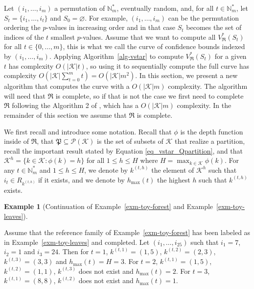 \documentclass[
  11pt,
  a4paper,
]{article}
\theoremstyle{plain}
\theoremstyle{definition}
\newtheorem{example}{Example}[section]
\theoremstyle{plain}
\theoremstyle{definition}
\theoremstyle{plain}
\theoremstyle{remark}
\begin{document}
Let \((i_1,\dotsc, i_m)\) a permutation of \(\mathbb{N}_m^*\),
eventually random, and, for all \(t\in\mathbb{N}_m^*\), let
\(S_t=\{i_1,\dotsc,i_t\}\) and \(S_0=\varnothing\). For example,
\((i_1,\dotsc, i_m)\) can be the permutation ordering the \(p\)-values
in increasing order and in that case \(S_t\) becomes the set of indices
of the \(t\) smallest \(p\)-values. Assume that we want to compute all
\(V^*_{\mathfrak{R}}(S_t)\) for all \(t\in\{ 0,\dotsc,m\}\), this is
what we call the curve of confidence bounds indexed by
\((i_1,\dotsc, i_m).\) Applying  Algorithm~\ref{alg-vstar}  to compute
\(V^*_{\mathfrak{R}}(S_t)\) for a given \(t\) has complexity
\(O(|\mathcal{K}|t)\), so using it to sequentially compute the full
curve has complexity
\(O\left(  |\mathcal{K}|\sum_{t=0}^m t\right)=O\left(|\mathcal{K}|m^2\right)\).
In this section, we present a new algorithm that computes the curve with
a \(O\left(|\mathcal{K}|m\right)\) complexity. The algorithm will need
that \(\mathfrak{R}\) is complete, so if that is not the case we first
need to complete \(\mathfrak{R}\) following the Algorithm 2 of
\citet{MR4178188}, which has a \(O(|\mathcal{K}|m)\) complexity. In the
remainder of this section we assume that \(\mathfrak{R}\) is complete.

We first recall and introduce some notation. Recall that \(\phi\) is the
depth function inside of \(\mathfrak{R}\), that
\(\mathfrak P \subseteq \mathcal P(\mathcal{K})\) is the set of subsets
of \(\mathcal{K}\) that realize a partition, recall the important result
stated by Equation \eqref{eq_vstar_Qpartition}, and that
\(\mathcal{K}^h=\{ k\in\mathcal{K}: \phi(k)=h  \}\) for all
\(1\leq h\leq H\) where \(H=\max_{k\in\mathcal{K}}\phi(k)\). For any
\(t\in\mathbb{N}_m^*\) and \(1\leq h\leq H\), we denote by \(k^{(t,h)}\)
the element of \(\mathcal{K}^h\) such that \(i_t\in R_{k^{(t,h)}}\) if
it exists, and we denote by \(h_{\max}(t)\) the highest \(h\) such that
\(k^{(t,h)}\) exists.

\begin{example}[Continuation of Example~\ref{exm-toy-forest} and
Example~\ref{exm-toy-leaves}]\protect\hypertarget{exm-kth}{}\label{exm-kth}

Assume that the reference family of Example~\ref{exm-toy-forest} has
been labeled as in Example~\ref{exm-toy-leaves} and completed. Let
\((i_1,\dotsc, i_{25})\) such that \(i_1=7\), \(i_2=1\) and \(i_3=24\).
Then for \(t=1\), \(k^{(t,1)}=(1,5)\), \(k^{(t,2)}=(2,3)\),
\(k^{(t,3)}=(3,3)\) and \(h_{\max}(t)=H=3\). For \(t=2\),
\(k^{(t,1)}=(1,5)\), \(k^{(t,2)}=(1,1)\), \(k^{(t,3)}\) does not exist
and \(h_{\max}(t)=2\). For \(t=3\), \(k^{(t,1)}=(8,8)\), \(k^{(t,2)}\)
does not exist and \(h_{\max}(t)=1\).

\end{example}
\end{document}
